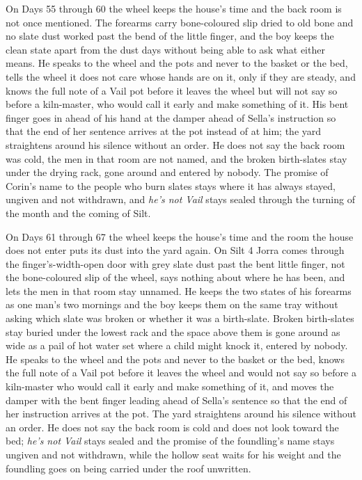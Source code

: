 \documentclass{design/chronicle}
\begin{document}
{On Days 55 through 60 the wheel keeps the house’s time and the back room is not once mentioned. The forearms carry bone-coloured slip dried to old bone and no slate dust worked past the bend of the little finger, and the boy keeps the clean state apart from the dust days without being able to ask what either means. He speaks to the wheel and the pots and never to the basket or the bed, tells the wheel it does not care whose hands are on it, only if they are steady, and knows the full note of a Vail pot before it leaves the wheel but will not say so before a kiln-master, who would call it early and make something of it. His bent finger goes in ahead of his hand at the damper ahead of Sella’s instruction so that the end of her sentence arrives at the pot instead of at him; the yard straightens around his silence without an order. He does not say the back room was cold, the men in that room are not named, and the broken birth-slates stay under the drying rack, gone around and entered by nobody. The promise of Corin’s name to the people who burn slates stays where it has always stayed, ungiven and not withdrawn, and \emph{he’s not Vail} stays sealed through the turning of the month and the coming of Silt.

On Days 61 through 67 the wheel keeps the house’s time and the room the house does not enter puts its dust into the yard again. On Silt 4 Jorra comes through the finger’s-width-open door with grey slate dust past the bent little finger, not the bone-coloured slip of the wheel, says nothing about where he has been, and lets the men in that room stay unnamed. He keeps the two states of his forearms as one man’s two mornings and the boy keeps them on the same tray without asking which slate was broken or whether it was a birth-slate. Broken birth-slates stay buried under the lowest rack and the space above them is gone around as wide as a pail of hot water set where a child might knock it, entered by nobody. He speaks to the wheel and the pots and never to the basket or the bed, knows the full note of a Vail pot before it leaves the wheel and would not say so before a kiln-master who would call it early and make something of it, and moves the damper with the bent finger leading ahead of Sella’s sentence so that the end of her instruction arrives at the pot. The yard straightens around his silence without an order. He does not say the back room is cold and does not look toward the bed; \emph{he’s not Vail} stays sealed and the promise of the foundling’s name stays ungiven and not withdrawn, while the hollow seat waits for his weight and the foundling goes on being carried under the roof unwritten.

}
\end{document}
